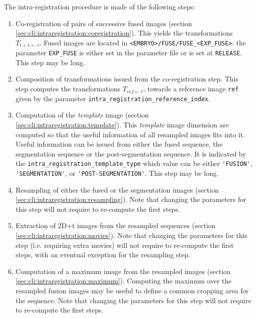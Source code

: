 The intra-registration procedure is made of the following steps:
\begin{enumerate}
\itemsep -0.5ex
\item \label{it:intrareg:co:register} Co-registration of pairs of successive fused images (section
  \ref{sec:cli:intraregistration:coregistration}). This yields the
  transformations $T_{t+1 \leftarrow t}$. Fused images are located in
  \verb|<EMBRYO>/FUSE/FUSE_<EXP_FUSE>|: the parameter \verb|EXP_FUSE|
  is either set in the parameter file or is set at
  \verb|RELEASE|. This step may be long. 

\item Composition of transformations issued from the co-registration
  step. This step computes the transformations $T_{ref \leftarrow
    t}$. towards a reference image \verb|ref| given by the parameter
  \verb|intra_registration_reference_index|. 

\item \label{it:intrareg:co:template} Computation of the \textit{template} image (section
  \ref{sec:cli:intraregistration:template}). This \textit{template}
  image dimension are computed so that the useful information of all
  resampled images fits into it. Useful information can be issued from
  either the fused sequence, the segmentation sequence or the
  post-segmentation sequence. It is indicated by the
  \verb|intra_registration_template_type| which value can be either
  \verb|'FUSION'|,  \verb|'SEGMENTATION'|, or
  \verb|'POST-SEGMENTATION'|. This step may be long. 

\item \label{it:intrareg:co:resampling}
  Resampling of either the fused or the segmentation images
  (section \ref{sec:cli:intraregistration:resampling}). Note that
  changing the parameters for this step will not require to re-compute
  the first steps. 

\item \label{it:intrareg:co:movies}
  Extraction of 2D+t images from the resampled sequences (section
  \ref{sec:cli:intraregistration:movies}). Note that changing the
  parameters for this step (i.e. requiring extra movies) will not
  require to re-compute the first steps, with an eventual exception
  for the resampling step. 

\item \label{it:intrareg:co:maximum}
  Computation of a maximum image from the resampled images (section
  \ref{sec:cli:intraregistration:maximum}). Computing the maximum over  
  the resampled fusion images may be useful to define a common cropping
  area for the sequence.
  Note that changing the parameters for this step will not require 
  to re-compute the first steps. 

\end{enumerate}



